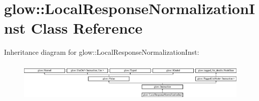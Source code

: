 \hypertarget{classglow_1_1_local_response_normalization_inst}{}\section{glow\+:\+:Local\+Response\+Normalization\+Inst Class Reference}
\label{classglow_1_1_local_response_normalization_inst}
Inheritance diagram for glow\+:\+:Local\+Response\+Normalization\+Inst\+:\begin{figure}[H]
\begin{center}
\leavevmode
\includegraphics[height=1.922747cm]{classglow_1_1_local_response_normalization_inst}
\end{center}
\end{figure}
